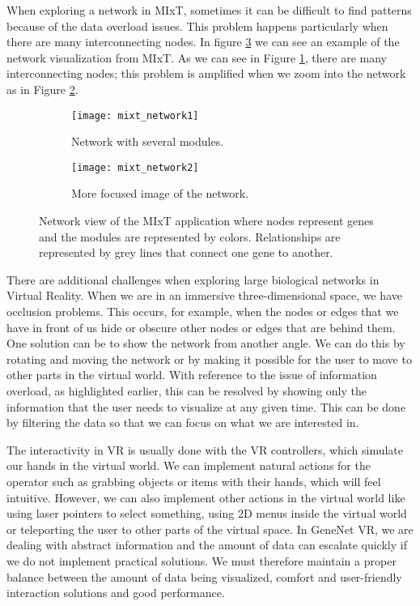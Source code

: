 When exploring a network in MIxT, sometimes it can be difficult to find patterns because of the data overload issues. This problem happens particularly when there are many interconnecting nodes. In figure \ref{fig:mixt_network} we can see an example of the network visualization from MIxT. As we can see in Figure \ref{fig:mixt_network1}, there are many interconnecting nodes; this problem is amplified when we zoom into the network as in Figure \ref{fig:mixt_network_zoom}.

\begin{figure}[h!]
    \centering%
    \begin{subfigure}[t]{0.5\textwidth}
        \centering%
        \texttt{[image: mixt\_network1]}
        \caption{Network with several modules.}
        \label{fig:mixt_network1}
    \end{subfigure}%
    \begin{subfigure}[t]{0.5\textwidth}
        \centering%
        \texttt{[image: mixt\_network2]}
        \caption{More focused image of the network.}
        \label{fig:mixt_network_zoom}
    \end{subfigure}

    \caption{Network view of the MIxT application where nodes represent genes and the modules are represented by colors. Relationships are represented by grey lines that connect one gene to another.}
    \label{fig:mixt_network}
\end{figure}

There are additional challenges when exploring large biological networks in Virtual Reality. When we are in an immersive three-dimensional space, we have occlusion problems. This occurs, for example, when the nodes or edges that we have in front of us hide or obscure other nodes or edges that are behind them. One solution can be to show the network from another angle. We can do this by rotating and moving the network or by making it possible for the user to move to other parts in the virtual world. With reference to the issue of information overload, as highlighted earlier, this can be resolved by showing only the information that the user needs to visualize at any given time. This can be done by filtering the data so that we can focus on what we are interested in.

The interactivity in VR is usually done with the VR controllers, which simulate our hands in the virtual world. We can implement natural actions for the operator such as grabbing objects or items with their hands, which will feel intuitive. However, we can also implement other actions in the virtual world like using laser pointers to select something, using 2D menus inside the virtual world or teleporting the user to other parts of the virtual space. In GeneNet VR, we are dealing with abstract information and the amount of data can escalate quickly if we do not implement practical solutions. We must therefore maintain a proper balance between the amount of data being visualized, comfort and user-friendly interaction solutions and good performance.


